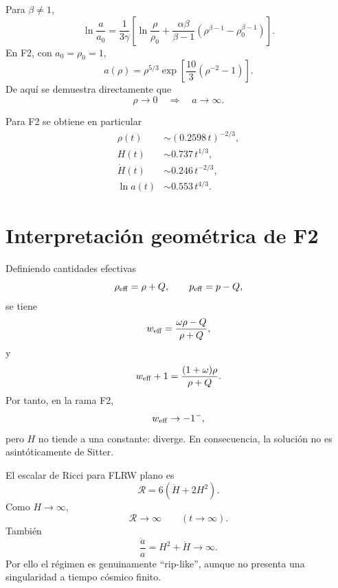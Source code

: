 \documentclass[11pt,a4paper]{article}
\newcommand{\R}{\mathcal{R}}
\begin{document}
Para $\beta\neq1$,
\begin{equation}
    \ln\frac{a}{a_0}
    =
    \frac{1}{3\gamma}
    \left[
    \ln\frac{\rho}{\rho_0}
    +
    \frac{\alpha\beta}{\beta-1}
    \left(
    \rho^{\beta-1}
    -
    \rho_0^{\beta-1}
    \right)
    \right].
\end{equation}
En F2, con $a_0=\rho_0=1$,
\begin{equation}
    \boxed{
    a(\rho)=
    \rho^{5/3}
    \exp\left[
    \frac{10}{3}
    \left(
    \rho^{-2}-1
    \right)
    \right]
    }.
\end{equation}
De aquí se demuestra directamente que
\[
\rho\to0
\quad\Longrightarrow\quad
a\to\infty.
\]

Para F2 se obtiene en particular
\begin{align}
    \rho(t)&\sim(0.2598\,t)^{-2/3},\\
    H(t)&\sim0.737\,t^{1/3},\\
    \dot H(t)&\sim0.246\,t^{-2/3},\\
    \ln a(t)&\sim0.553\,t^{4/3}.
\end{align}

\section{Interpretación geométrica de F2}

Definiendo cantidades efectivas
\begin{equation}
    \rho_{\rm eff}=\rho+Q,
    \qquad
    p_{\rm eff}=p-Q,
\end{equation}
se tiene
\begin{equation}
    w_{\rm eff}
    =
    \frac{\omega\rho-Q}{\rho+Q},
\end{equation}
y
\begin{equation}
    w_{\rm eff}+1
    =
    \frac{(1+\omega)\rho}{\rho+Q}.
\end{equation}
Por tanto, en la rama F2,
\begin{equation}
    w_{\rm eff}\to-1^{-},
\end{equation}
pero $H$ no tiende a una constante: diverge. En consecuencia,
la solución no es asintóticamente de Sitter.

El escalar de Ricci para FLRW plano es
\begin{equation}
    \R=6(\dot H+2H^2).
\end{equation}
Como $H\to\infty$,
\[
\R\to\infty
\qquad (t\to\infty).
\]
También
\[
\frac{\ddot a}{a}=H^2+\dot H\to\infty.
\]
Por ello el régimen es genuinamente ``rip-like'', aunque no presenta una
singularidad a tiempo cósmico finito.
\end{document}
